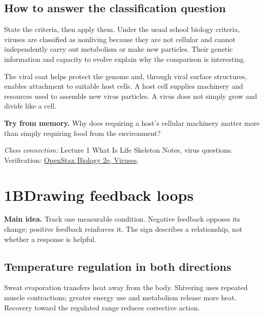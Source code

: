 \documentclass[11pt,letterpaper]{article}
\newcommand{\pagechapter}[2]{\clearpage\section*{#1}\phantomsection\label{#2}\addcontentsline{toc}{section}{#1}}
\newcommand{\idea}[1]{\textbf{Main idea.} #1\par}
\newcommand{\memorycheck}[1]{\par\smallskip\textbf{Try from memory.} #1\par}
\newcommand{\ico}[3][forest]{{\fontsize{#3}{#3}\selectfont\textcolor{#1}{#2}}}
\newcommand{\pn}[3]{\ico[#1]{#2}{19pt}\\[2pt]#3}
\newcommand{\classsource}[1]{{\footnotesize\textit{Class connection:} #1\par}}
\begin{document}
\subsection*{How to answer the classification question}
State the criteria, then apply them. Under the usual school biology criteria, viruses are classified as nonliving because they are not cellular and cannot independently carry out metabolism or make new particles. Their genetic information and capacity to evolve explain why the comparison is interesting.

The viral coat helps protect the genome and, through viral surface structures, enables attachment to suitable host cells. A host cell supplies machinery and resources used to assemble new virus particles. A virus does not simply grow and divide like a cell.
\memorycheck{Why does requiring a host's cellular machinery matter more than simply requiring food from the environment?}
\classsource{Lecture 1 What Is Life Skeleton Notes, virus questions. Verification: \href{https://openstax.org/books/biology-2e/pages/21-introduction}{OpenStax Biology 2e, Viruses}.}

\pagechapter{1B\quad Drawing feedback loops}{feedback}
\idea{Track one measurable condition. Negative feedback opposes its change; positive feedback reinforces it. The sign describes a relationship, not whether a response is helpful.}
\subsection*{Temperature regulation in both directions}
\begin{center}
\par
\end{center}
Sweat evaporation transfers heat away from the body. Shivering uses repeated muscle contractions; greater energy use and metabolism release more heat. Recovery toward the regulated range reduces corrective action.
\end{document}
